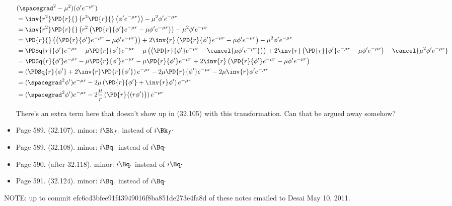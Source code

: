 \begin{itemize}
\begin{align*}
&(\spacegrad^2 - \mu^2)(\phi' e^{-\mu r}) \\
&= \inv{r^2} \PD{r}{} \left( r^2 \PD{r}{} \left( \phi' e^{-\mu r} \right) \right) - \mu^2 \phi' e^{-\mu r} \\
&= \inv{r^2} \PD{r}{} \left( r^2 \left( \PD{r}{\phi'} e^{-\mu r} -\mu \phi' e^{-\mu r} \right) \right) - \mu^2 \phi' e^{-\mu r} \\
&= 
\PD{r}{} \left( \left( \PD{r}{\phi'} e^{-\mu r} -\mu \phi' e^{-\mu r} \right) \right) 
+ 2 \inv{r} \left( \PD{r}{\phi'} e^{-\mu r} -\mu \phi' e^{-\mu r} \right)  
- \mu^2 \phi' e^{-\mu r} \\
&= 
\PDSq{r}{\phi'} e^{-\mu r} -\mu \PD{r}{\phi'} e^{-\mu r} 
-\mu \left( \left( \PD{r}{\phi'} e^{-\mu r} - \cancel{\mu \phi' e^{-\mu r}} \right) \right) 
+ 2 \inv{r} \left( \PD{r}{\phi'} e^{-\mu r} -\mu \phi' e^{-\mu r} \right)  
- \cancel{\mu^2 \phi' e^{-\mu r}} \\
&=
\PDSq{r}{\phi'} e^{-\mu r} -\mu \PD{r}{\phi'} e^{-\mu r} 
-\mu \PD{r}{\phi'} e^{-\mu r} 
+ 2 \inv{r} \left( \PD{r}{\phi'} e^{-\mu r} -\mu \phi' e^{-\mu r} \right) 
\\
&=
\left( \PDSq{r}{\phi'} 
+ 2 \inv{r} \PD{r}{\phi'} \right) e^{-\mu r} 
-2 \mu \PD{r}{\phi'} e^{-\mu r} 
-2 \mu \inv{r} \phi' e^{-\mu r} 
\\
&=
(\spacegrad^2 \phi') e^{-\mu r}
- 2 \mu \left( \PD{r}{\phi'} + \inv{r} \phi' \right) e^{-\mu r} 
\\
&=
(\spacegrad^2 \phi') e^{-\mu r}
- 2 \frac{\mu}{r} \left( \PD{r}{(r \phi')} \right) e^{-\mu r} 
\\
\end{align*}

There's an extra term here that doesn't show up in (32.105) with this transformation.  Can that be argued away somehow?

\item Page 589.  (32.107).  minor: $i \Bk_f .$ instead of $i \Bk_f \cdot$
\item Page 589.  (32.108).  minor: $i \Bq .$ instead of $i \Bq \cdot$
\item Page 590.  (after 32.118).  minor: $i \Bq .$ instead of $i \Bq \cdot$
\item Page 591.  (32.124).  minor: $i \Bq .$ instead of $i \Bq \cdot$
\end{itemize}

NOTE: up to commit efc6cd3bfee91f43949016f8ba851de273e4fa8d of these notes emailed to Desai May 10, 2011.
 

